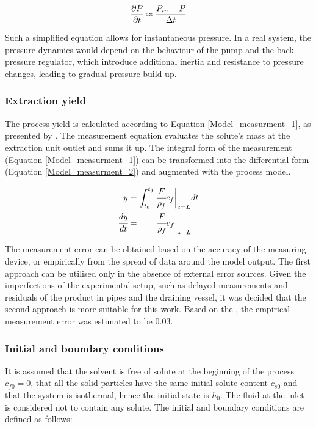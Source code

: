 \documentclass[a4paper,fleqn]{cas-dc}
\begin{document}
		{\footnotesize
			\begin{equation}
				\frac{\partial {\color{black}P}}{\partial t} \approx \frac{{\color{black}P_{in}} - {\color{black}P} }{\Delta t}
		\end{equation}}
		
		Such a simplified equation allows for instantaneous pressure. In a real system, the pressure dynamics would depend on the behaviour of the pump and the back-pressure regulator, which introduce additional inertia and resistance to pressure changes, leading to gradual pressure build-up.
		
		\subsubsection{Extraction yield} \label{CH: Yield}
		
		The process yield is calculated according to Equation \ref{Model_measurment_1}, as presented by \citet{Sovova1994a}. The measurement equation evaluates the solute's mass at the extraction unit outlet and sums it up. The integral form of the measurement (Equation \ref{Model_measurment_1}) can be transformed into the differential form (Equation \ref{Model_measurment_2}) and augmented with the process model.
		
		{\footnotesize
			\begin{align} 
				\label{Model_measurment_1}
				y &= \int_{t_0}^{t_f} \cfrac{F}{\rho_f} c_f \biggr\rvert_{z=L} dt \\
				\cfrac{dy}{dt} &= \qquad \cfrac{F}{\rho_f} c_f \biggr\rvert_{z=L} 
				\label{Model_measurment_2}
		\end{align}	}

		The measurement error can be obtained based on the accuracy of the measuring device, or empirically from the spread of data around the model output. The first approach can be utilised only in the absence of external error sources. Given the imperfections of the experimental setup, such as delayed measurements and residuals of the product in pipes and the draining vessel, it was decided that the second approach is more suitable for this work. Based on the \citet{Sliczniuk2024}, the empirical measurement error was estimated to be 0.03.
		
		\subsubsection{Initial and boundary conditions} 
		It is assumed that the solvent is free of solute at the beginning of the process $c_{f0}=0$, that all the solid particles have the same initial solute content $c_{s0}$ and that the system is isothermal, hence the initial state is $h_0$. The fluid at the inlet is considered not to contain any solute. The initial and boundary conditions are defined as follows:
		
\end{document}
